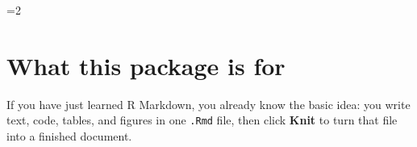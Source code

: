 \documentclass[12pt]{article}
\newif\ifdocdesignerdocdesigner
\newif\ifdocdesigneranon
\newcommand{\docdesignermaincolumns}{1}
\begin{document}
\begin{multicols}{2}
\setlength{\columnsep}{0.24in}
\raggedcolumns
\footnotesize
{}
\setlength{\parindent}{0.85em}
\setlength{\parskip}{0pt}
\titleformat{\section}{\normalsize\bfseries\color{docdesigneraccent}}{}{0pt}{}
\titleformat{\subsection}{\footnotesize\bfseries}{}{0pt}{}
\titlespacing{\section}{0pt}{0.5em}{0.14em}
\titlespacing{\subsection}{0pt}{0.38em}{0.1em}
\par\vspace{0.45em}
\else
\clearpage
\fi
\setcounter{page}{1}


\ifdocdesignerdocdesigner\else
\ifnum\docdesignermaincolumns=2\relax
  \twocolumn
\fi
\fi

\ifdocdesigneranon
\begingroup
\small
\noindent\textit{This manuscript is set to anonymous mode. Identifying metadata fields are suppressed on the title page.}\par
\endgroup
\vspace{1em}
\fi

\section{What this package is for}\label{what-this-package-is-for}

If you have just learned R Markdown, you already know the basic idea:
you write text, code, tables, and figures in one \texttt{.Rmd} file,
then click \textbf{Knit} to turn that file into a finished document.


\end{multicols}
\end{document}
